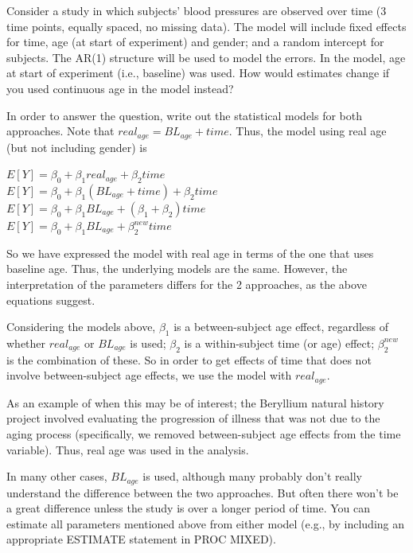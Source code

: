 \documentclass[
  9pt,
  ignorenonframetext,
]{beamer}
\begin{document}
\begin{frame}{}
\protect\hypertarget{section}{}
Consider a study in which subjects' blood pressures are observed over
time (3 time points, equally spaced, no missing data). The model will
include fixed effects for time, age (at start of experiment) and gender;
and a random intercept for subjects. The AR(1) structure will be used to
model the errors. In the model, age at start of experiment (i.e.,
baseline) was used. How would estimates change if you used continuous
age in the model instead?

In order to answer the question, write out the statistical models for
both approaches. Note that \(real_{age} = BL_{age} + time\). Thus, the
model using real age (but not including gender) is

\(E[Y]= \beta_0+ \beta_1 real_{age}+ \beta_2 time\)\\
\(E[Y]= \beta_0+ \beta_1 (BL_{age} +time)+ \beta_2 time\)\\
\(E[Y]= \beta_0+ \beta_1 BL_{age}+( \beta_1+ \beta_2)time\)\\
\(E[Y]= \beta_0+ \beta_1 BL_{age}+ \beta_2^{new} time\)

So we have expressed the model with real age in terms of the one that
uses baseline age. Thus, the underlying models are the same. However,
the interpretation of the parameters differs for the 2 approaches, as
the above equations suggest.
\end{frame}

\begin{frame}{}
\protect\hypertarget{section-1}{}
Considering the models above, \(\beta_1\) is a between-subject age
effect, regardless of whether \(real_{age}\) or \(BL_{age}\) is used;
\(\beta_2\) is a within-subject time (or age) effect; \(\beta_2^{new}\)
is the combination of these. So in order to get effects of time that
does not involve between-subject age effects, we use the model with
\(real_{age}\).

As an example of when this may be of interest; the Beryllium natural
history project involved evaluating the progression of illness that was
not due to the aging process (specifically, we removed between-subject
age effects from the time variable). Thus, real age was used in the
analysis.

In many other cases, \(BL_{age}\) is used, although many probably don't
really understand the difference between the two approaches. But often
there won't be a great difference unless the study is over a longer
period of time. You can estimate all parameters mentioned above from
either model (e.g., by including an appropriate ESTIMATE statement in
PROC MIXED).
\end{frame}
\end{document}
